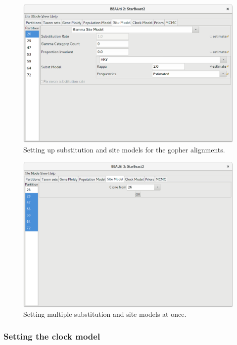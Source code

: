 \documentclass{article}
\begin{document}
\begin{figure}[htb!]
\centering
\includegraphics[width=\textwidth]{figures/beauti-hky.png}
\caption{Setting up substitution and site models for the gopher alignments.}
\label{fig:HKY}
\end{figure}

\begin{figure}[htb!]
\centering
\includegraphics[width=\textwidth]{figures/beauti-clone.png}
\caption{Setting multiple substitution and site models at once.}
\label{fig:clone}
\end{figure}

\clearpage

\subsubsection*{Setting the clock model}
\end{document}
